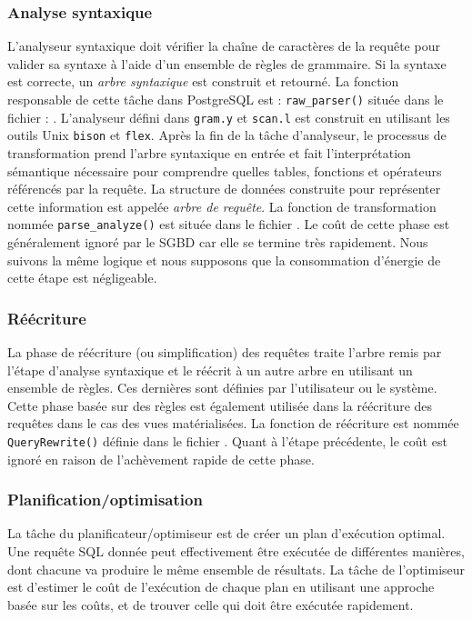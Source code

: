 \subsubsection{Analyse syntaxique}\label{subsec:Parse}
L'analyseur syntaxique doit vérifier la chaîne de caractères de la requête pour valider sa syntaxe à l'aide d'un ensemble de règles de grammaire.  Si la syntaxe est correcte, un \textit{arbre syntaxique} est construit et retourné. La fonction responsable de cette tâche dans PostgreSQL est : \texttt{raw\_parser()} située dans le fichier : . L'analyseur défini dans \texttt{gram.y} et \texttt{scan.l} est construit en utilisant les outils Unix \texttt{bison} et \texttt{flex}. Après la fin de la tâche d'analyseur, le processus de transformation prend l'arbre syntaxique en entrée et fait l'interprétation sémantique nécessaire pour comprendre quelles tables, fonctions et opérateurs référencés par la requête. La structure de données construite pour représenter cette information est appelée \textit{arbre de requête}. La fonction de transformation nommée \texttt{parse\_analyze()} est située dans le fichier .  Le coût de cette phase est généralement ignoré par le SGBD car elle se termine très rapidement. Nous suivons la même logique et nous supposons que la consommation d'énergie de cette étape est négligeable.

\subsubsection{Réécriture}\label{subsec:Rewrite}
La phase de réécriture (ou simplification) des requêtes traite l'arbre remis par l'étape d'analyse syntaxique et le réécrit à un autre arbre en utilisant un ensemble de règles. Ces dernières sont définies par l'utilisateur ou le système. Cette phase basée sur des règles est également utilisée dans la réécriture des requêtes dans le cas des vues matérialisées. La fonction de réécriture est nommée \texttt{QueryRewrite()} définie dans le fichier . Quant à l'étape précédente, le coût est ignoré en raison de l'achèvement rapide de cette phase.

\subsubsection{Planification/optimisation}\label{subsec:PlanOptimize}
La tâche du planificateur/optimiseur est de créer un plan d'exécution optimal. Une requête SQL donnée peut effectivement être exécutée de différentes manières, dont chacune va produire le même ensemble de résultats. La tâche de l'optimiseur est d'estimer le coût de l'exécution de chaque plan en utilisant une approche basée sur les coûts, et de trouver celle qui doit être exécutée rapidement.

